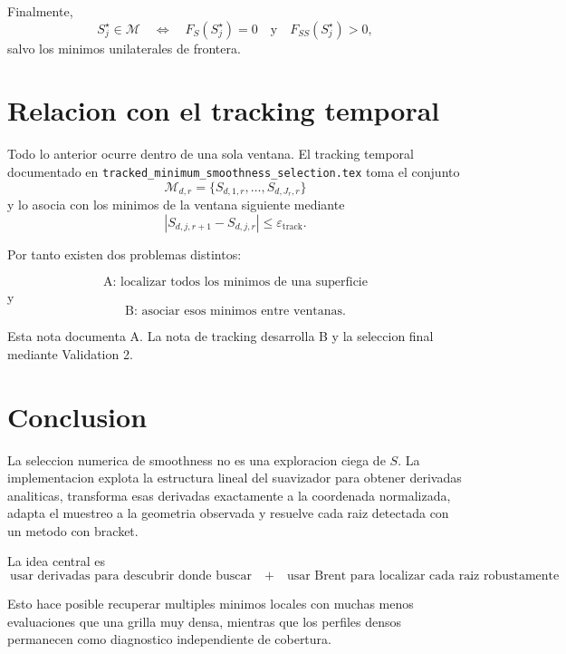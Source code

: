 \documentclass[11pt]{article}
\begin{document}
Finalmente,
\[
S_j^\star\in\mathcal M
\quad\Longleftrightarrow\quad
F_S(S_j^\star)=0
\quad\text{y}\quad
F_{SS}(S_j^\star)>0,
\]
salvo los minimos unilaterales de frontera.

\section{Relacion con el tracking temporal}

Todo lo anterior ocurre dentro de una sola ventana. El tracking temporal
documentado en
\texttt{tracked\_minimum\_smoothness\_selection.tex}
toma el conjunto
\[
\mathcal M_{d,r}
=
\{S_{d,1,r},\ldots,S_{d,J_r,r}\}
\]
y lo asocia con los minimos de la ventana siguiente mediante
\[
|S_{d,j,r+1}-S_{d,j,r}|
\le
\varepsilon_{\mathrm{track}}.
\]

Por tanto existen dos problemas distintos:

\[
\boxed{
\text{A: localizar todos los minimos de una superficie}
}
\]
y
\[
\boxed{
\text{B: asociar esos minimos entre ventanas}
}.
\]

Esta nota documenta A. La nota de tracking desarrolla B y la seleccion final
mediante Validation 2.

\section{Conclusion}

La seleccion numerica de smoothness no es una exploracion ciega de \(S\). La
implementacion explota la estructura lineal del suavizador para obtener
derivadas analiticas, transforma esas derivadas exactamente a la coordenada
normalizada, adapta el muestreo a la geometria observada y resuelve cada raiz
detectada con un metodo con bracket.

La idea central es
\[
\boxed{
\text{usar derivadas para descubrir donde buscar}
\quad+\quad
\text{usar Brent para localizar cada raiz robustamente}
}.
\]

Esto hace posible recuperar multiples minimos locales con muchas menos
evaluaciones que una grilla muy densa, mientras que los perfiles densos
permanecen como diagnostico independiente de cobertura.
\end{document}
